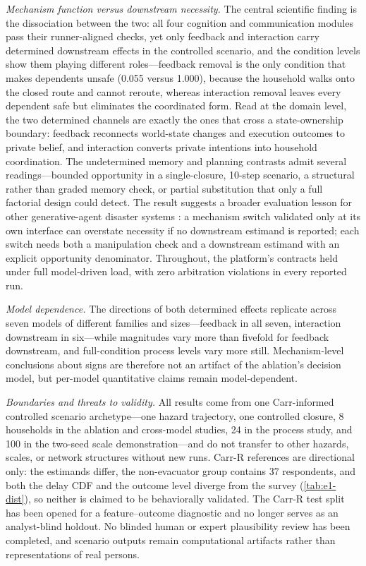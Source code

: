 \documentclass[journal]{IEEEtran}
\begin{document}
\emph{Mechanism function versus downstream necessity.} The central scientific
finding is the dissociation between the two: all four cognition and
communication modules pass their runner-aligned checks, yet only feedback and
interaction carry determined downstream effects in the controlled scenario, and
the condition levels show them playing different roles---feedback removal is
the only condition that makes dependents unsafe (0.055 versus 1.000), because
the household walks onto the closed route and cannot reroute, whereas
interaction removal leaves every dependent safe but eliminates the coordinated
form. Read at the domain level, the two determined channels are exactly the
ones that cross a state-ownership boundary: feedback reconnects world-state
changes and execution outcomes
to private belief, and interaction converts private intentions into household
coordination. The undetermined memory and planning contrasts admit several
readings---bounded opportunity in a single-closure, 10-step scenario, a
structural rather than graded memory check, or partial substitution that only
a full factorial design could detect. The result suggests a broader evaluation
lesson for
other generative-agent disaster systems
\cite{chen2025flare,dang2025fireagents,yang2026whenagents,sultimov2026respond}:
a mechanism switch validated only at its own interface can overstate necessity
if no downstream estimand is reported;
each switch needs both a manipulation check and a downstream estimand with an
explicit opportunity denominator. Throughout, the platform's contracts held
under full model-driven load, with zero arbitration violations in every
reported run.

\emph{Model dependence.} The directions of both determined effects replicate
across seven models of different families and sizes---feedback in all seven,
interaction downstream in six---while magnitudes vary more than fivefold for
feedback downstream, and full-condition process levels vary more still.
Mechanism-level conclusions about signs are therefore not an artifact of the
ablation's decision model, but per-model quantitative claims remain
model-dependent.

\emph{Boundaries and threats to validity.} All results come from one
Carr-informed controlled scenario archetype---one hazard trajectory, one
controlled closure, 8 households in the ablation and cross-model studies, 24
in the process study, and 100 in the two-seed scale demonstration---and do not
transfer to other hazards, scales, or network structures without new runs.
Carr-R references are directional only: the estimands differ, the
non-evacuator group contains 37 respondents, and both the delay CDF and the
outcome level diverge from the survey (\cref{tab:e1-dist}), so neither is
claimed to be behaviorally validated. The Carr-R test split has been opened for
a feature--outcome diagnostic and no longer serves as an analyst-blind
holdout. No blinded human or expert plausibility review has been
completed, and scenario outputs remain computational artifacts rather than
representations of real persons.
\end{document}
